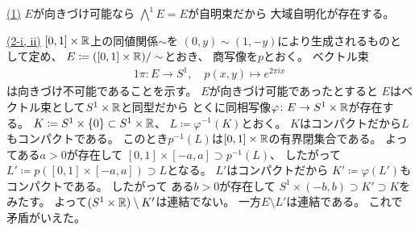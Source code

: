 \documentclass[report, notitlepage]{jlreq}
\begin{document}
\begin{problem}[問5]
\end{problem}

\begin{answer}
    \uline{(1)} \quad
    $E$が向きづけ可能なら
    $\bigwedge^1 E = E$が自明束だから
    大域自明化が存在する。

    \uline{(2-i, ii)} \quad
    $[0, 1] \times \mathbb{R}$上の同値関係$\sim$を
    $(0, y) \sim (1, -y)$により生成されるものとして定め、
    $E \coloneqq ([0, 1] \times \mathbb{R}) / \sim$とおき、
    商写像を$p$とおく。
    ベクトル束
    \begin{alignat}{1}
        \pi \colon E \to S^1, \quad p(x, y) \mapsto e^{2\pi ix}
    \end{alignat}
    は向きづけ不可能であることを示す。
    $E$が向きづけ可能であったとすると
    $E$はベクトル束として$S^1 \times \mathbb{R}$と同型だから
    とくに同相写像$\varphi \colon E \to S^1 \times \mathbb{R}$が存在する。
    $K \coloneqq S^1 \times \{ 0 \} \subset S^1 \times \mathbb{R}$、
    $L \coloneqq \varphi^{-1}(K)$とおく。
    $K$はコンパクトだから$L$もコンパクトである。
    このとき$p^{-1}(L)$は$[0, 1] \times \mathbb{R}$の有界閉集合である。
    よってある$a > 0$が存在して
    $[0, 1] \times [-a, a] \supset p^{-1}(L)$、
    したがって$L' \coloneqq p([0, 1] \times [-a, a]) \supset L$となる。
    $L'$はコンパクトだから
    $K' \coloneqq \varphi(L')$もコンパクトである。
    したがって
    ある$b > 0$が存在して
    $S^1 \times (-b, b) \supset K' \supset K$をみたす。
    よって$(S^1 \times \mathbb{R}) \setminus K'$は連結でない。
    一方$E \setminus L'$は連結である。
    これで矛盾がいえた。
\end{answer}

\begin{problem}[問6]
\end{problem}
\end{document}
